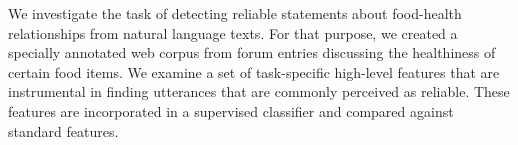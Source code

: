 We investigate the task of detecting reliable statements about food-health relationships from natural language texts.
 For that purpose, we created a specially annotated web corpus from forum
 entries discussing the healthiness of certain food items.
 We examine a set of task-specific high-level features that are instrumental in
 finding utterances that are commonly perceived as reliable.
 These features are incorporated in a supervised classifier and compared against
 standard features.

